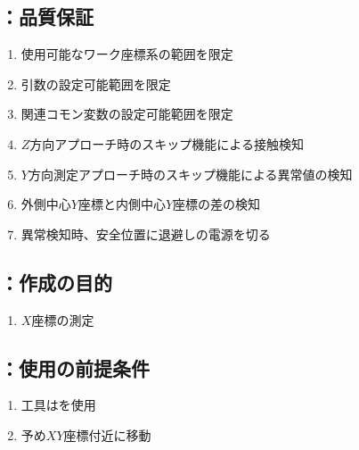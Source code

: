 \clearpage
\subsection{\MYIWidth：品質保証}
\begin{enumerate}[label*=\sarrow]
\item 使用可能なワーク座標系の範囲を限定
\item {}引数の設定可能範囲を限定
\item 関連コモン変数の設定可能範囲を限定
\item $Z$方向アプローチ時のスキップ機能による接触検知
\item $Y$方向測定アプローチ時のスキップ機能による異常値の検知
\item 外側中心$Y$座標と内側中心$Y$座標の差の検知
\item 異常検知時、安全位置に退避し\TouchSensorProbe の電源を切る
\end{enumerate}



\clearpage


\subsection{\MXIface：作成の目的}
\begin{enumerate}[label*=\sarrow]
\item \OutcutCenter $X$座標の測定
\end{enumerate}


\subsection{\MXIface：使用の前提条件}
\begin{enumerate}[label*=\sarrow]
\item 工具は\TouchSensorProbe を使用
\item 予め\OutcutCenter$XY$座標付近に移動
\end{enumerate}


